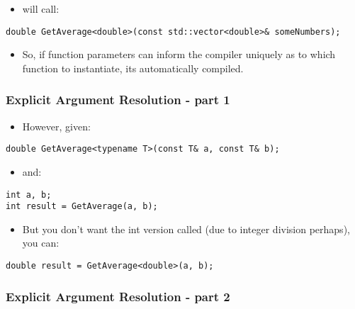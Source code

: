 \begin{itemize}
\tightlist
\item
  will call:
\end{itemize}

\begin{verbatim}
double GetAverage<double>(const std::vector<double>& someNumbers);
\end{verbatim}

\begin{itemize}
\tightlist
\item
  So, if function parameters can inform the compiler uniquely as to
  which function to instantiate, its automatically compiled.
\end{itemize}

\hypertarget{explicit-argument-resolution---part-1}{%
\subsubsection{Explicit Argument Resolution - part
1}\label{explicit-argument-resolution---part-1}}

\begin{itemize}
\tightlist
\item
  However, given:
\end{itemize}

\begin{verbatim}
double GetAverage<typename T>(const T& a, const T& b);
\end{verbatim}

\begin{itemize}
\tightlist
\item
  and:
\end{itemize}

\begin{verbatim}
int a, b;
int result = GetAverage(a, b);
\end{verbatim}

\begin{itemize}
\tightlist
\item
  But you don't want the int version called (due to integer division
  perhaps), you can:
\end{itemize}

\begin{verbatim}
double result = GetAverage<double>(a, b);
\end{verbatim}

\hypertarget{explicit-argument-resolution---part-2}{%
\subsubsection{Explicit Argument Resolution - part
2}\label{explicit-argument-resolution---part-2}}

